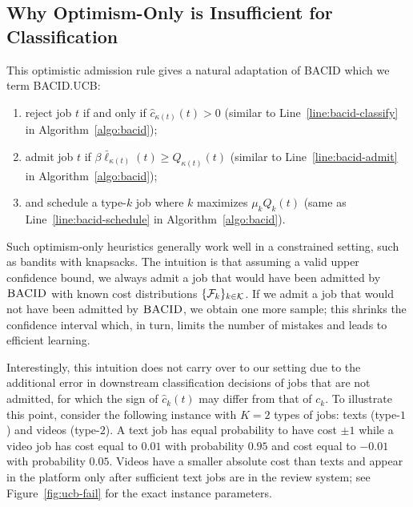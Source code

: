 \subsection{Why Optimism-Only is Insufficient for Classification}\label{sec:opti-fail}
This optimistic admission rule gives a natural adaptation of \textsc{BACID} which we term \textsc{BACID.UCB}: 
\begin{enumerate}
\vspace{-\topsep}
\item reject job $t$ if and only if $\hat{c}_{\kappa(t)}(t) > 0$ (similar to Line~\ref{line:bacid-classify} in Algorithm~\ref{algo:bacid}); 
\vspace{-\topsep}
\item admit job $t$ if $\beta \bar{\ell}_{\kappa(t)}(t) \geq Q_{\kappa(t)}(t)$ (similar to Line~\ref{line:bacid-admit} in Algorithm~\ref{algo:bacid}); 
\vspace{-\topsep}
\item and schedule a type-$k$ job where $k$ maximizes $\mu_{k}Q_{k}(t)$ (same as Line~\ref{line:bacid-schedule} in Algorithm~\ref{algo:bacid}).\vspace{-\topsep}
\end{enumerate}
Such optimism-only heuristics generally work well in a constrained setting, such as bandits with knapsacks. The intuition is that assuming a valid upper confidence bound, we always admit a job that would have been admitted by $\textsc{BACID}$ with known cost distributions $\{\mathcal{F}_k\}_{k \in \mathcal{K}}$. If we admit a job that would not have been admitted by $\textsc{BACID}$, we obtain one more sample; this shrinks the confidence interval which, in turn, limits the number of mistakes and leads to efficient learning. 

Interestingly, this intuition does not carry over to our setting due to the additional error in downstream classification decisions of jobs that are not admitted, for which the sign of $\hat{c}_k(t)$ may differ from that of $c_k$. To illustrate this point, consider the following instance with $K=2$ types of jobs: texts (type-$1$) and videos (type-$2$). A text job has equal probability to have cost $\pm 1$ while a video job has cost equal to $0.01$ with probability $0.95$ and cost equal to $-0.01$ with probability $0.05$. Videos have a smaller absolute cost than texts and appear in the platform only after sufficient text jobs are in the review system; see Figure~\ref{fig:ucb-fail} for the exact instance parameters.

